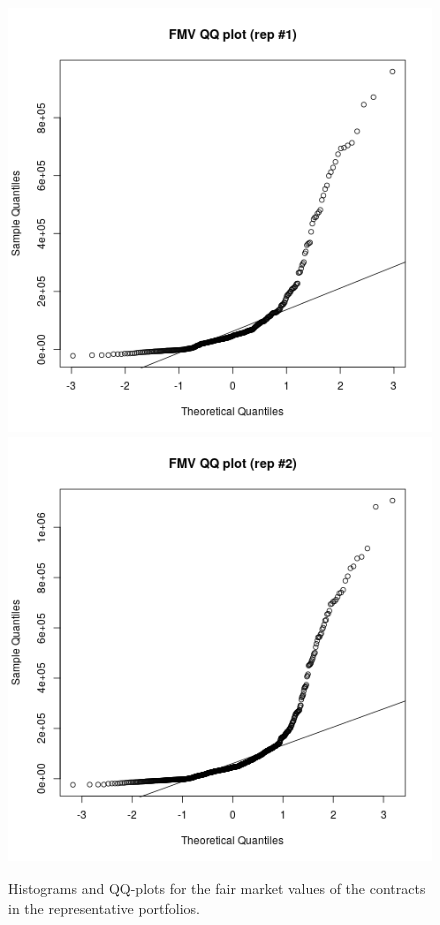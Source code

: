 \begin{figure}[h!]
{\includegraphics[scale=0.4]{pictures/boxcox_rep1_fmv_qqplot}\includegraphics[scale=0.4]{pictures/boxcox_rep2_fmv_qqplot} 
}
\caption{Histograms and QQ-plots for the fair market values of the contracts in the representative portfolios.}\label{original_fmv}
\end{figure}

